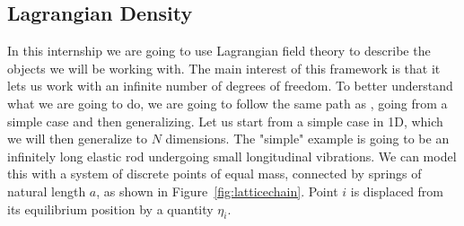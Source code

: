 \documentclass{article}
\begin{document}
\subsection{Lagrangian Density}
In this internship we are going to use Lagrangian field theory to describe the objects we will be working with. The main interest of this framework is that it lets us work with an infinite number of degrees of freedom.
To better understand what we are going to do, we are going to follow the same path as \cite{goldstein1950classical}, going from a simple case and then generalizing. Let us start from a simple case in 1D, which we will then generalize to $N$ dimensions. The "simple" example is going to be an infinitely long elastic rod undergoing small
longitudinal vibrations. We can model this with a system of discrete points of equal mass, connected by springs of natural length $a$, as shown in Figure~\ref{fig:latticechain}. Point $i$ is displaced from its equilibrium position by a quantity $\eta_i$.
\end{document}
